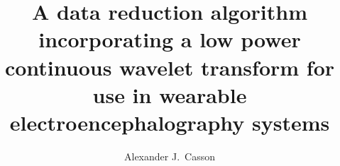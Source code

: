 \documentclass[times,12pt,thesis,online]{uom_thesis_casson} %
\begin{document}


  




\title{A data reduction algorithm incorporating a low power continuous wavelet transform for use in wearable electroencephalography systems}
\author{Alexander J.\ Casson}

\wordcount{\mywordcount}		                   %
\maketitle
\end{document}
